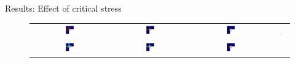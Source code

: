 \documentclass[10pt,xcolor=dvipsnames,compress]{beamer}
\begin{document}
\begin{frame}{Results: Effect of critical stress}
\centering
    \begin{figure}
        \centering
        \footnotesize
        \begin{tabular}{c c c c}
        \includegraphics[trim={3.6in 1.8in 3.5in 2.5in},clip,width=0.2\textwidth]{Figures/CS1.png}&
        \includegraphics[trim={3.6in 1.8in 3.5in 2.5in},clip,width=0.2\textwidth]{Figures/CS2.png}&
        \includegraphics[trim={3.6in 1.8in 3.5in 2.5in},clip,width=0.2\textwidth]{Figures/CS3.png}&
        \includegraphics[width=0.06\textwidth]{Figures/design_contour.png}
        \\
        \includegraphics[trim={3.6in 1.8in 3.5in 2.5in},clip,width=0.2\textwidth]{Figures/Stress_CS1.png}&
        \includegraphics[trim={3.6in 1.8in 3.5in 2.5in},clip,width=0.2\textwidth]{Figures/Stress_CS2.png}&
        \includegraphics[trim={3.6in 1.8in 3.5in 2.5in},clip,width=0.2\textwidth]{Figures/Stress_CS3.png}&

\end{tabular}
\end{figure}
\end{frame}
\end{document}
